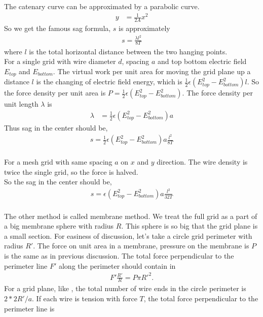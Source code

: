 The catenary curve can be approximated by a parabolic curve. 
\begin{align}
y & = \frac{1}{2 A}x^2
\end{align}
So we get the famous sag formula, $s$ is approximately  
\begin{align}
s = \frac{\lambda l^2}{8 T}
\end{align}
where $l$ is the total horizontal distance between the two hanging points. 
\\
For a single grid with wire diameter $d$, spacing $a$ and top bottom electric field $E_{top}$ and $E_{bottom}$. The virtual work per unit area for moving the grid plane up a distance $l$ is the changing of electric field energy, which is $\frac{1}{2}\epsilon (E_{top}^2 - E_{bottom}^2) l$. So the force density per unit area is $P = \frac{1}{2}\epsilon (E_{top}^2 - E_{bottom}^2)$. The force density per unit length $\lambda $ is 
\begin{align}
\lambda & = \frac{1}{2}\epsilon (E_{top}^2 - E_{bottom}^2) a 
\end{align}
Thus sag in the center should be,
\begin{align}
s = \frac{1}{2} \epsilon (E_{top}^2 - E_{bottom}^2) a \frac{l^2}{8 T}
\end{align}
\\
For a mesh grid with same spacing $a$ on $x$ and $y$ direction. The wire density is twice the single grid, so the force is halved.\\
So the sag in the center should be,
\begin{align}
s = \epsilon (E_{top}^2 - E_{bottom}^2) a \frac{l^2}{32 T}
\end{align}
\\
The other method is called membrane method. We treat the full grid as a part of a big membrane sphere with radius $R$. This sphere is so big that the grid plane is a small section. For easiness of discussion, let's take a circle grid perimeter with radius $R'$. The force on unit area in a membrane, pressure on the membrane is $P$ is the same as in previous discussion. The total force perpendicular to the perimeter line $F'$ along the perimeter should contain in
\begin{align}
F' \frac{R'}{R} = P \pi R'^2 .
\end{align} 
For a grid plane, like , the total number of wire ends in the circle perimeter is $2* 2 R'/a$. If each wire is tension with force $T$, the total force perpendicular to the perimeter line is
